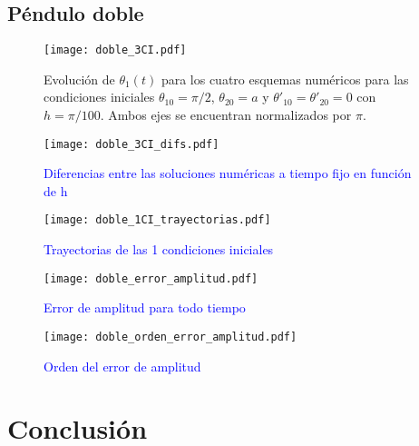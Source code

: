 \documentclass[aps,prb,twocolumn,superscriptaddress,floatfix,longbibliography]{revtex4-2}
\newcounter{para}
\begin{document}
\twocolumngrid






\subsection{Péndulo doble}

\begin{figure}[h]
  \texttt{[image: doble\_3CI.pdf]}
  \caption{Evolución de $\theta_1(t)$ para los cuatro esquemas numéricos para las condiciones iniciales $\theta_{1 0} = \pi/2$, $\theta_{2 0} = a$ y $\theta'_{1 0} = \theta'_{2 0} = 0$ con $h = \pi/100$. Ambos ejes se encuentran normalizados por $\pi$.}
   \label{fig:doble_3CI}
\end{figure}


\begin{figure}[h]
  \texttt{[image: doble\_3CI\_difs.pdf]}
  \caption{\textcolor{blue}{Diferencias entre las soluciones numéricas a tiempo fijo en función de h}}
   \label{fig:doble_3CI_difs}
\end{figure}

\begin{figure}[h]
  \texttt{[image: doble\_1CI\_trayectorias.pdf]}
  \caption{\textcolor{blue}{Trayectorias de las 1 condiciones iniciales}}
   \label{fig:doble_1CI_trayectorias}
\end{figure}

\begin{figure}[h]
  \texttt{[image: doble\_error\_amplitud.pdf]}
  \caption{\textcolor{blue}{Error de amplitud para todo tiempo}}
   \label{fig:doble_error_amplitud.pdf}
\end{figure}

\begin{figure}[h]
  \texttt{[image: doble\_orden\_error\_amplitud.pdf]}
  \caption{\textcolor{blue}{Orden del error de amplitud}}
   \label{fig:doble_orden_error_amplitud}
\end{figure}


\section{Conclusión}





\end{document}
